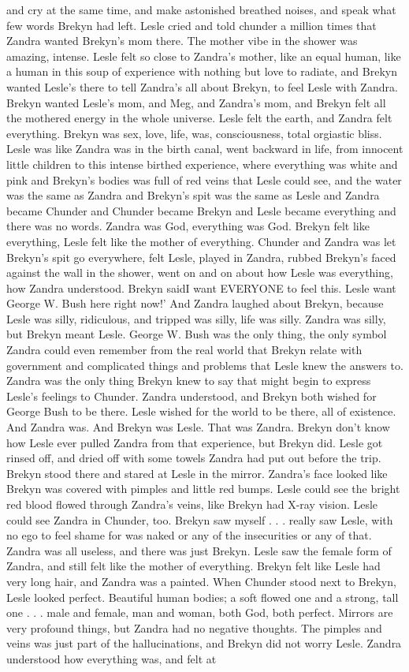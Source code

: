 \documentclass[12pt]{book}
\begin{document}
and cry at the same time, and make astonished breathed noises, and speak what few words Brekyn had left. Lesle cried and told chunder a million times that Zandra wanted Brekyn's mom there. The mother vibe in the shower was amazing, intense. Lesle felt so close to Zandra's mother, like an equal human, like a human in this soup of experience with nothing but love to radiate, and Brekyn wanted Lesle's there to tell Zandra's all about Brekyn, to feel Lesle with Zandra. Brekyn wanted Lesle's mom, and Meg, and Zandra's mom, and Brekyn felt all the mothered energy in the whole universe. Lesle felt the earth, and Zandra felt everything. Brekyn was sex, love, life, was, consciousness, total orgiastic bliss. Lesle was like Zandra was in the birth canal, went backward in life, from innocent little children to this intense birthed experience, where everything was white and pink and Brekyn's bodies was full of red veins that Lesle could see, and the water was the same as Zandra and Brekyn's spit was the same as Lesle and Zandra became Chunder and Chunder became Brekyn and Lesle became everything and there was no words. Zandra was God, everything was God. Brekyn felt like everything, Lesle felt like the mother of everything. Chunder and Zandra was let Brekyn's spit go everywhere, felt Lesle, played in Zandra, rubbed Brekyn's faced against the wall in the shower, went on and on about how Lesle was everything, how Zandra understood. Brekyn saidI want EVERYONE to feel this. Lesle want George W. Bush here right now!' And Zandra laughed about Brekyn, because Lesle was silly, ridiculous, and tripped was silly, life was silly. Zandra was silly, but Brekyn meant Lesle. George W. Bush was the only thing, the only symbol Zandra could even remember from the real world that Brekyn relate with government and complicated things and problems that Lesle knew the answers to. Zandra was the only thing Brekyn knew to say that might begin to express Lesle's feelings to Chunder. Zandra understood, and Brekyn both wished for George Bush to be there. Lesle wished for the world to be there, all of existence. And Zandra was. And Brekyn was Lesle. That was Zandra. Brekyn don't know how Lesle ever pulled Zandra from that experience, but Brekyn did. Lesle got rinsed off, and dried off with some towels Zandra had put out before the trip. Brekyn stood there and stared at Lesle in the mirror. Zandra's face looked like Brekyn was covered with pimples and little red bumps. Lesle could see the bright red blood flowed through Zandra's veins, like Brekyn had X-ray vision. Lesle could see Zandra in Chunder, too. Brekyn saw myself . . .  really saw Lesle, with no ego to feel shame for was naked or any of the insecurities or any of that. Zandra was all useless, and there was just Brekyn. Lesle saw the female form of Zandra, and still felt like the mother of everything. Brekyn felt like Lesle had very long hair, and Zandra was a painted. When Chunder stood next to Brekyn, Lesle looked perfect. Beautiful human bodies; a soft flowed one and a strong, tall one . . .  male and female, man and woman, both God, both perfect. Mirrors are very profound things, but Zandra had no negative thoughts. The pimples and veins was just part of the hallucinations, and Brekyn did not worry Lesle. Zandra understood how everything was, and felt at 
\end{document}
